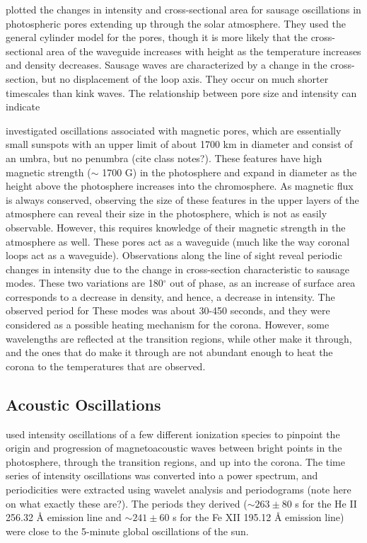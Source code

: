 \documentclass[preprint2]{aastex}
\begin{document}
\cite{sausage_1} plotted the changes in intensity and cross-sectional
area for sausage oscillations in photospheric pores extending up
through the solar atmosphere. They used the general cylinder model for
the pores, though it is more likely that the cross-sectional area of
the waveguide increases with height as the temperature increases and
density decreases.
Sausage waves are characterized by a change in the cross-section,
but no displacement of the loop axis. They occur on much shorter
timescales than kink waves.
The relationship between pore size and intensity can
indicate

\cite{sausage_2} investigated oscillations associated with magnetic
pores, which are essentially small sunspots with an upper limit of
about 1700 km in diameter and consist of an umbra, but no penumbra
(cite class notes?). These features have high magnetic strength
($\sim$ 1700 G) in the photosphere and expand in diameter as the
height above the
photosphere increases into the chromosphere. As magnetic flux is
always conserved, observing the size of these features in the upper
layers of the atmosphere can reveal their size in the photosphere,
which is not as easily observable. However, this requires knowledge
of their magnetic strength in the atmosphere as well.
These pores act as a waveguide (much like the way coronal loops act
as a waveguide). Observations along the line of sight reveal periodic
changes in intensity due to the change in cross-section characteristic
to sausage modes. These two variations are 180$^{\circ}$ out of phase,
as an increase of surface area corresponds to a decrease in density,
and hence, a decrease in intensity. The observed period for These modes
was about 30-450 seconds, and they were considered as a
possible heating mechanism for the corona. However, some wavelengths are
reflected at the transition regions, while other make it through,
and the ones that do make it through are not abundant enough to heat
the corona to the temperatures that are observed.
\subsection{Acoustic Oscillations}

\cite{acoustic_2} used intensity oscillations of a few different ionization
species to pinpoint the origin and progression of magnetoacoustic waves
between bright points in the photosphere, through the transition regions,
and up into the corona. The time series of intensity oscillations was
converted into a power spectrum, and periodicities were extracted using
wavelet analysis and periodograms (note here on what exactly these are?).
The periods they derived
($\sim 263 \pm 80$ s for the He II 256.32 \AA{} emission line and
$\sim 241 \pm 60$ s for the Fe XII 195.12 \AA{}  emission line)
were close to the 5-minute global oscillations of the sun.
\end{document}
